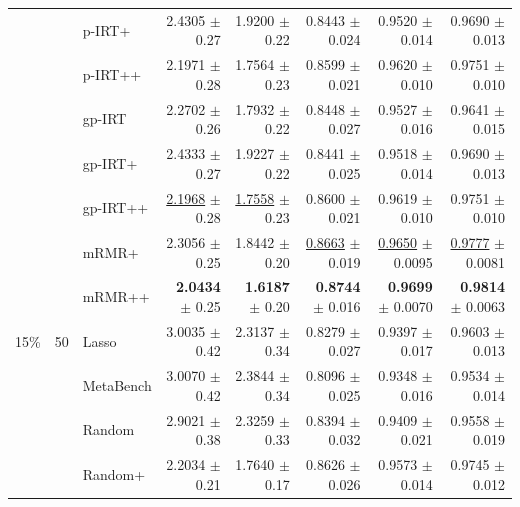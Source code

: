 \begin{longtable}{llp{}rrrrr}
 &  & p-IRT+ & 2.4305 {\scriptsize $\pm$ 0.27} & 1.9200 {\scriptsize $\pm$ 0.22} & 0.8443 {\scriptsize $\pm$ 0.024} & 0.9520 {\scriptsize $\pm$ 0.014} & 0.9690 {\scriptsize $\pm$ 0.013} \\
 &  & p-IRT++ & 2.1971 {\scriptsize $\pm$ 0.28} & 1.7564 {\scriptsize $\pm$ 0.23} & 0.8599 {\scriptsize $\pm$ 0.021} & 0.9620 {\scriptsize $\pm$ 0.010} & 0.9751 {\scriptsize $\pm$ 0.010} \\
 &  & gp-IRT & 2.2702 {\scriptsize $\pm$ 0.26} & 1.7932 {\scriptsize $\pm$ 0.22} & 0.8448 {\scriptsize $\pm$ 0.027} & 0.9527 {\scriptsize $\pm$ 0.016} & 0.9641 {\scriptsize $\pm$ 0.015} \\
 &  & gp-IRT+ & 2.4333 {\scriptsize $\pm$ 0.27} & 1.9227 {\scriptsize $\pm$ 0.22} & 0.8441 {\scriptsize $\pm$ 0.025} & 0.9518 {\scriptsize $\pm$ 0.014} & 0.9690 {\scriptsize $\pm$ 0.013} \\
 &  & gp-IRT++ & \underline{2.1968} {\scriptsize $\pm$ 0.28} & \underline{1.7558} {\scriptsize $\pm$ 0.23} & 0.8600 {\scriptsize $\pm$ 0.021} & 0.9619 {\scriptsize $\pm$ 0.010} & 0.9751 {\scriptsize $\pm$ 0.010} \\
 &  & mRMR+ & 2.3056 {\scriptsize $\pm$ 0.25} & 1.8442 {\scriptsize $\pm$ 0.20} & \underline{0.8663} {\scriptsize $\pm$ 0.019} & \underline{0.9650} {\scriptsize $\pm$ 0.0095} & \underline{0.9777} {\scriptsize $\pm$ 0.0081} \\
 &  & mRMR++ & \textbf{2.0434} {\scriptsize $\pm$ 0.25} & \textbf{1.6187} {\scriptsize $\pm$ 0.20} & \textbf{0.8744} {\scriptsize $\pm$ 0.016} & \textbf{0.9699} {\scriptsize $\pm$ 0.0070} & \textbf{0.9814} {\scriptsize $\pm$ 0.0063} \\
\midrule
15\% & 50 & Lasso & 3.0035 {\scriptsize $\pm$ 0.42} & 2.3137 {\scriptsize $\pm$ 0.34} & 0.8279 {\scriptsize $\pm$ 0.027} & 0.9397 {\scriptsize $\pm$ 0.017} & 0.9603 {\scriptsize $\pm$ 0.013} \\
 &  & MetaBench & 3.0070 {\scriptsize $\pm$ 0.42} & 2.3844 {\scriptsize $\pm$ 0.34} & 0.8096 {\scriptsize $\pm$ 0.025} & 0.9348 {\scriptsize $\pm$ 0.016} & 0.9534 {\scriptsize $\pm$ 0.014} \\
 &  & Random & 2.9021 {\scriptsize $\pm$ 0.38} & 2.3259 {\scriptsize $\pm$ 0.33} & 0.8394 {\scriptsize $\pm$ 0.032} & 0.9409 {\scriptsize $\pm$ 0.021} & 0.9558 {\scriptsize $\pm$ 0.019} \\
 &  & Random+ & 2.2034 {\scriptsize $\pm$ 0.21} & 1.7640 {\scriptsize $\pm$ 0.17} & 0.8626 {\scriptsize $\pm$ 0.026} & 0.9573 {\scriptsize $\pm$ 0.014} & 0.9745 {\scriptsize $\pm$ 0.012} \\

\end{longtable}
